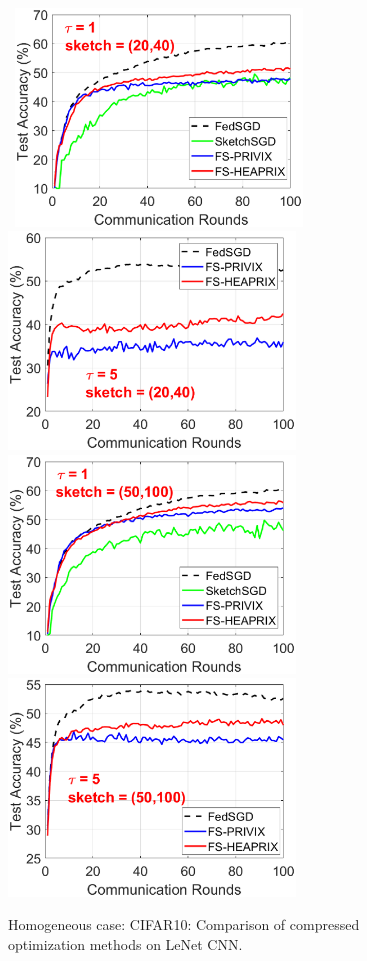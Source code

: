 \documentclass[11pt]{article}
\begin{document}
\begin{figure}[h]
	\begin{center}
		\mbox{%
		\includegraphics[width=3.0in]{CIFAR_figures/cifar_local1_sketch20_iid1_test_acc.eps}  
		 \includegraphics[width=3.0in]{CIFAR_figures/cifar_local5_sketch20_iid1_test_acc.eps}
		}
		\mbox{%
	\includegraphics[width=3.0in]{CIFAR_figures/cifar_local1_sketch50_iid1_test_acc.eps} 
		\includegraphics[width=3.0in]{CIFAR_figures/cifar_local5_sketch50_iid1_test_acc.eps}
		}
	\end{center}
	\caption{Homogeneous case: CIFAR10: Comparison of compressed optimization methods on LeNet CNN.}
    \label{fig:CIFAR-homog}
\end{figure}
\end{document}
